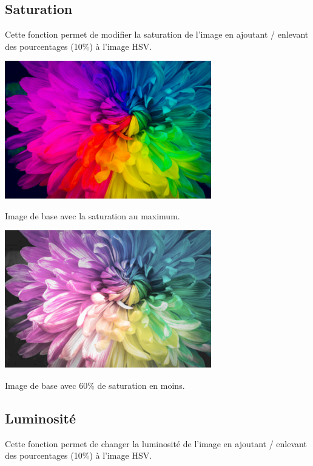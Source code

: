 \documentclass{article}
\begin{document}
\subsection{Saturation}
Cette fonction permet de modifier la saturation de l'image en ajoutant / enlevant des pourcentages (10\%) à l'image HSV.
\bigbreak

\begin{center} 
    \includegraphics[width=9cm]{../SaturationMax}

    Image de base avec la saturation au maximum.
    \end{center}
\bigbreak

\begin{center} 
    \includegraphics[width=9cm]{../SaturationMoins6}

    Image de base avec 60\% de saturation en moins.
    \end{center}

\subsection{Luminosité}
Cette fonction permet de changer la luminosité de l'image en ajoutant / enlevant des pourcentages (10\%) à l'image HSV.
\bigbreak
\end{document}
